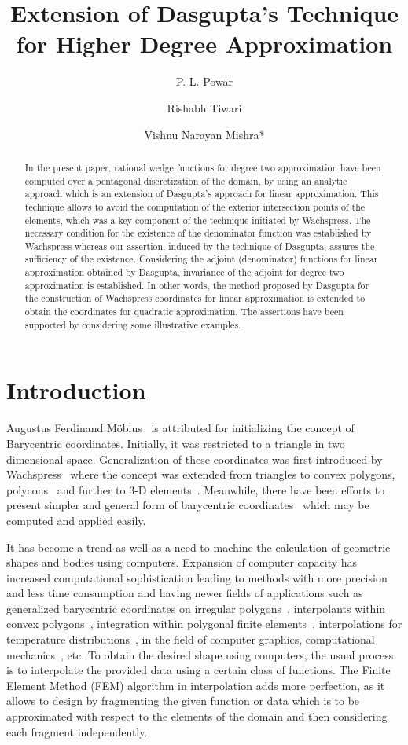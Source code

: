 \documentclass[automatic-bibliography, defaultmaths=false]{univsci}
\title{Extension of Dasgupta's Technique for Higher Degree Approximation}
\author[1]{P. L. Powar}
\author[1]{Rishabh Tiwari}
\author[2]{Vishnu Narayan Mishra*}
\begin{document}
\maketitle
\thispagestyle{firstpage}

\begin{abstract}
In the present paper, rational wedge functions for degree two approximation have
been computed over a pentagonal discretization of the domain, by using an
analytic approach which is an extension of Dasgupta\rq{}s approach for linear
approximation. This technique allows to avoid the computation of the exterior
intersection points of the elements, which was a key component of the technique
initiated by Wachspress. The necessary condition for the existence of the
denominator function was established by Wachspress whereas our assertion,
induced by the technique of Dasgupta, assures the sufficiency of the existence.
Considering the adjoint (denominator) functions for linear approximation
obtained by Dasgupta, invariance of the adjoint for degree two approximation is
established. In other words, the method proposed by Dasgupta for the
construction of Wachspress coordinates for linear approximation is extended to
obtain the coordinates for quadratic approximation. The assertions have been
supported by considering some illustrative examples.

\end{abstract}

\section{Introduction}
Augustus Ferdinand M\"obius~\cite{mo} is attributed for initializing the concept
of Barycentric coordinates. Initially, it was restricted to a triangle in two
dimensional space. Generalization of these coordinates was first introduced by
Wachspress~\cite{wach71} where the concept was extended from triangles to convex
polygons, polycons~\cite{wach73} and further to 3-D elements~\cite{warren, wach,
wachs}. Meanwhile, there have been efforts to present simpler and general form
of barycentric coordinates~\cite{1,2,3,4,5,6} which may be computed and applied
easily.

It has become a trend as well as a need to machine the calculation of geometric
shapes and bodies using computers. Expansion of computer capacity has increased
computational sophistication leading to methods with more precision and less
time consumption and having newer fields of applications such as generalized
barycentric coordinates on irregular polygons~\cite{7}, interpolants within
convex polygons~\cite{das}, integration within polygonal finite
elements~\cite{9}, interpolations for temperature distributions~\cite{10}, in
the field of computer graphics, computational mechanics~\cite{11}, etc. To
obtain the desired shape using computers, the usual process is to interpolate
the provided data using a certain class of functions. The Finite Element Method
(FEM) algorithm in interpolation adds more perfection, as it allows to design by
fragmenting the given function or data which is to be approximated with respect
to the elements of the domain and then considering each fragment independently.
\end{document}
